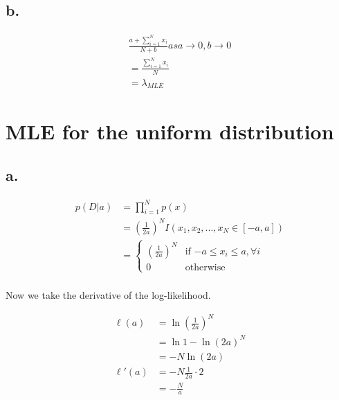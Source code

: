 \documentclass{article}
\begin{document}
\subsection{b.}

\begin{gather*}
  \frac{a + \sum_{i=1}^N x_i}{N + b} as a \to 0, b \to 0 \\
  = \frac{\sum_{i=1}^N x_i}{N} \\
  = \lambda_{MLE}
\end{gather*}

\section{MLE for the uniform distribution}

\subsection{a.}

\begin{align*}
  p(D|a) &= \prod_{i=1}^N p(x) \\
         &= \left( \frac{1}{2a} \right)^N I(x_1,x_2,...,x_N \in [-a,a]) \\
         &= \left\{ \begin{array}{ll}
                     \left( \frac{1}{2a} \right)^N & \mbox{if $-a \le x_i \le a, \forall i$} \\
                     0 & \mbox{otherwise} \end{array} \right. \\
\end{align*}

Now we take the derivative of the log-likelihood.

\begin{align*}
  \ell(a) &= \ln \left( \frac{1}{2a} \right)^N \\
          &= \ln 1 - \ln (2a)^N \\
          &= -N \ln (2a) \\
  \ell'(a) &= -N \frac{1}{2a} \cdot 2 \\
          &= -\frac{N}{a}
\end{align*}
\end{document}
